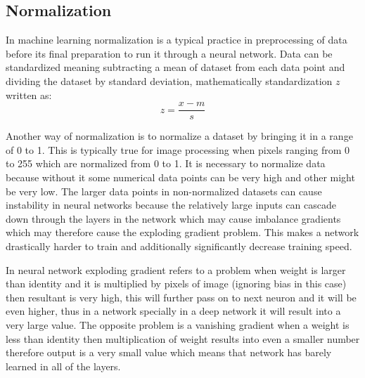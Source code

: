 \documentclass[11pt]{article}
\begin{document}

\subsection{Normalization}
In machine learning normalization is a typical practice in preprocessing of data before its final preparation to run it through a neural network. Data can be standardized meaning subtracting a mean of dataset from each data point and dividing the dataset by standard deviation, mathematically standardization $z$ written as:
$$ z = \dfrac{x-m}{s}$$

Another way of normalization is to normalize a dataset by bringing it in a range of 0 to 1. This is typically true for image processing when pixels ranging from 0 to 255 which are normalized from 0 to 1. It is necessary to normalize data because without it some numerical data points can be very high and other might be very low. The larger data points in non-normalized datasets can cause instability in neural networks because the relatively large inputs can cascade down through the layers in the network which may cause imbalance gradients which may therefore cause the exploding gradient problem. This makes a network drastically harder to train and additionally significantly decrease training speed.

In neural network exploding gradient refers to a problem when weight is larger than identity and it is multiplied by pixels of image (ignoring bias in this case) then resultant is very high, this will further pass on to next neuron and it will be even higher, thus in a network specially in a deep network it will result into a very large value. The opposite problem is a vanishing gradient when a weight is less than identity then multiplication of weight results into even a smaller number therefore output is a very small value which means that network has barely learned in all of the layers.
\end{document}
